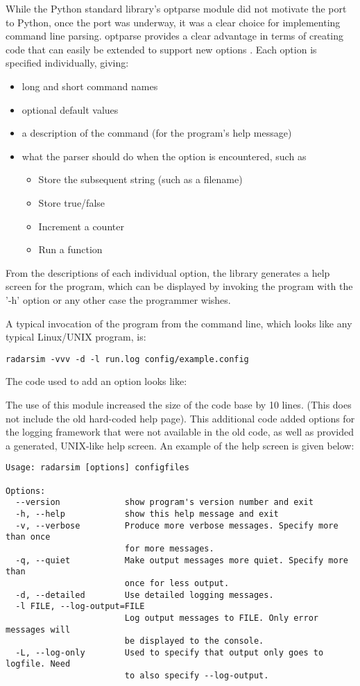 \documentclass[twocolumn]{article}
\begin{document}
While the Python standard library's optparse module did not motivate the port to
Python, once the port was underway, it was a clear choice for implementing
command line parsing. optparse provides a clear advantage in terms of creating
code that can easily be extended to support new options \cite{optparse}. Each
option is specified individually, giving:
\begin{itemize}
    \item long and short command names
    \item optional default values
    \item a description of the command (for the program's help message)
    \item what the parser should do when the option is encountered, such as
    \begin{itemize}
        \item Store the subsequent string (such as a filename)
        \item Store true/false
        \item Increment a counter
        \item Run a function
    \end{itemize}
\end{itemize}
From the descriptions of each individual option, the library generates a
help screen for the program, which can be displayed by invoking the program
with the '-h' option or any other case the programmer wishes.

A typical invocation of the program from the command line, which looks like
any typical Linux/UNIX program, is:

{\scriptsize\verb$radarsim -vvv -d -l run.log config/example.config$}

The code used to add an option looks like:

\lstset{language=Python}


The use of this module increased the size of the code base by 10 lines. (This does
not include the old hard-coded help page). This additional code added options
for the logging framework that were not available in the old code, as well
as provided a generated, UNIX-like help screen. An example of the help screen
is given below:

{\tiny
\begin{verbatim}
Usage: radarsim [options] configfiles

Options:
  --version             show program's version number and exit
  -h, --help            show this help message and exit
  -v, --verbose         Produce more verbose messages. Specify more than once
                        for more messages.
  -q, --quiet           Make output messages more quiet. Specify more than
                        once for less output.
  -d, --detailed        Use detailed logging messages.
  -l FILE, --log-output=FILE
                        Log output messages to FILE. Only error messages will
                        be displayed to the console.
  -L, --log-only        Used to specify that output only goes to logfile. Need
                        to also specify --log-output.
\end{verbatim}}
\end{document}
